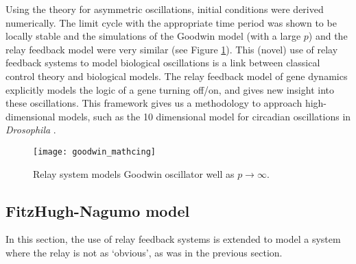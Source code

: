 \documentclass[a4paper, 12pt]{article}
\begin{document}
Using the theory for asymmetric oscillations, initial conditions were derived numerically. The limit cycle with the appropriate time period was shown to be locally stable and the simulations of the Goodwin model (with a large $p$) and the relay feedback model were very similar (see Figure \ref{goodwin_matching}). This (novel) use of relay feedback systems to model biological oscillations is a link between classical control theory and biological models. The relay feedback model of gene dynamics explicitly models the logic of a gene turning off/on, and gives new insight into these oscillations. This framework  gives us a methodology to approach high-dimensional models, such as the 10 dimensional model for circadian  oscillations in \textit{Drosophila} \cite{leloup}. 

\begin{figure}[h!]
\texttt{[image: goodwin\_mathcing]}
\caption{Relay system models Goodwin oscillator well as $p\rightarrow\infty$.}
\label{goodwin_matching}
\end{figure}

\FloatBarrier
\newpage
\subsection{FitzHugh-Nagumo model}
In this section, the use of relay feedback systems is extended to model a system where the relay is not as `obvious', as was in the previous section.
\end{document}
